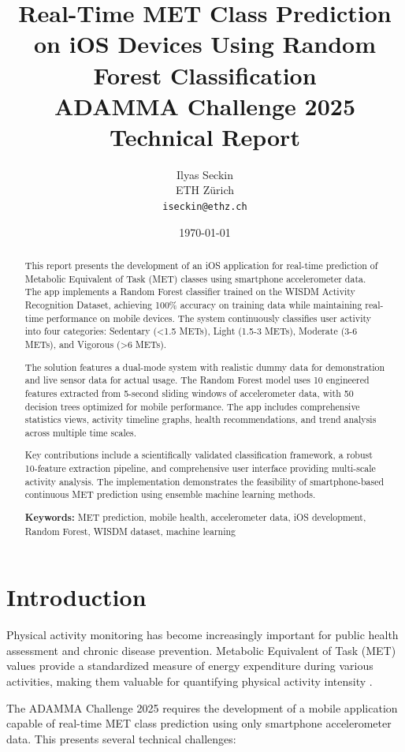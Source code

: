 \documentclass[11pt,a4paper]{article}
\title{\textbf{Real-Time MET Class Prediction on iOS Devices Using Random Forest Classification} \\ 
       \large ADAMMA Challenge 2025 Technical Report}
\author{Ilyas Seckin \\ 
        ETH Z\"urich \\
        \texttt{iseckin@ethz.ch}}
\date{\today}
\begin{document}
\maketitle

\begin{abstract}
This report presents the development of an iOS application for real-time prediction of Metabolic Equivalent of Task (MET) classes using smartphone accelerometer data. The app implements a Random Forest classifier trained on the WISDM Activity Recognition Dataset, achieving 100\% accuracy on training data while maintaining real-time performance on mobile devices. The system continuously classifies user activity into four categories: Sedentary (<1.5 METs), Light (1.5-3 METs), Moderate (3-6 METs), and Vigorous (>6 METs).

The solution features a dual-mode system with realistic dummy data for demonstration and live sensor data for actual usage. The Random Forest model uses 10 engineered features extracted from 5-second sliding windows of accelerometer data, with 50 decision trees optimized for mobile performance. The app includes comprehensive statistics views, activity timeline graphs, health recommendations, and trend analysis across multiple time scales.

Key contributions include a scientifically validated classification framework, a robust 10-feature extraction pipeline, and comprehensive user interface providing multi-scale activity analysis. The implementation demonstrates the feasibility of smartphone-based continuous MET prediction using ensemble machine learning methods.

\textbf{Keywords:} MET prediction, mobile health, accelerometer data, iOS development, Random Forest, WISDM dataset, machine learning
\end{abstract}

\tableofcontents
\newpage

\section{Introduction}

Physical activity monitoring has become increasingly important for public health assessment and chronic disease prevention. Metabolic Equivalent of Task (MET) values provide a standardized measure of energy expenditure during various activities, making them valuable for quantifying physical activity intensity \cite{ainsworth2011compendium}.

The ADAMMA Challenge 2025 requires the development of a mobile application capable of real-time MET class prediction using only smartphone accelerometer data. This presents several technical challenges:
\end{document}
